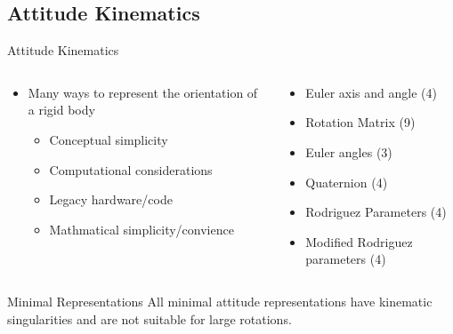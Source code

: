 
\subsection{Attitude Kinematics}
\begin{frame}[noframenumbering]{Attitude Kinematics}
\label{slide:attitude_kinematics}

\begin{columns}
\begin{column}{0.5\textwidth}
\begin{itemize}
    \item Many ways to represent the orientation of a rigid body
    \begin{itemize}
        \item Conceptual simplicity
        \item Computational considerations
        \item Legacy hardware/code
        \item Mathmatical simplicity/convience
    \end{itemize}
\end{itemize}
\end{column}
\pause
\begin{column}{0.5\textwidth}
    \begin{itemize}
        \item Euler axis and angle (4)
        \item Rotation Matrix (9)
        \item Euler angles (3)
        \item Quaternion (4)
        \item Rodriguez Parameters (4)
        \item Modified Rodriguez parameters (4)
    \end{itemize}
\end{column}
\end{columns}
\pause
\begin{block}{Minimal Representations}
    All minimal attitude representations have kinematic singularities and are not suitable for large rotations.
\end{block}

\hyperlink{slide:attitude_control}{}
\end{frame}

